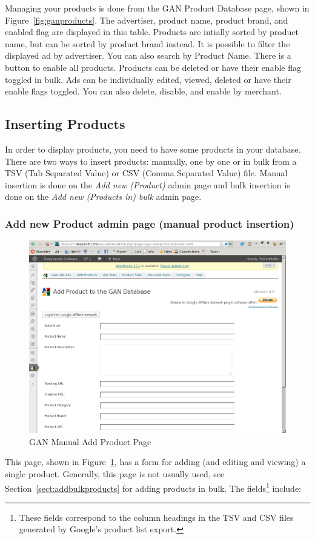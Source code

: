 \documentclass[letterpaper]{article}
\begin{document}
Managing your products is done from the GAN Product Database page,
shown in Figure~\ref{fig:ganproducts}. The advertiser, product name,
product brand, and enabled flag are displayed in this table. Products
are intially sorted by product name, but can be sorted by product brand
instead. It is possible to filter the displayed ad by advertiser. You
can also search by Product Name. There is a button to enable all
products. Products can be deleted or have their enable flag  
toggled in bulk.  Ads can be individually edited, viewed, deleted or  
have their enable flags toggled.  You can also delete, disable, and    
enable by merchant.

\subsection{Inserting Products}

In order to display products, you need to have some products in your
database. There are two ways to insert products: manually, one by one
or in bulk from a TSV (Tab Separated Value) or CSV (Comma Separated
Value) file. Manual insertion is done on the \emph{Add new (Product)}
admin page and bulk insertion is done on the \emph{Add new (Products
in) bulk} admin page.

\subsubsection{Add new Product admin page (manual product insertion)}

\begin{figure}[ht]
\begin{centering}
\includegraphics[width=4.5in]{ganaddproduct.png}
\caption{GAN Manual Add Product Page}
\label{fig:ganaddproduct}
\end{centering}
\end{figure}
This page, shown in Figure~\ref{fig:ganaddproduct}, has a form for adding
(and editing and viewing) a single product. Generally, this page is not
usually used, see Section~\ref{sect:addbulkproducts} for adding products
in bulk. The fields\footnote{These fields correspond to the column
headings in the TSV and CSV files generated by Google's product list
export.} include:
\end{document}
